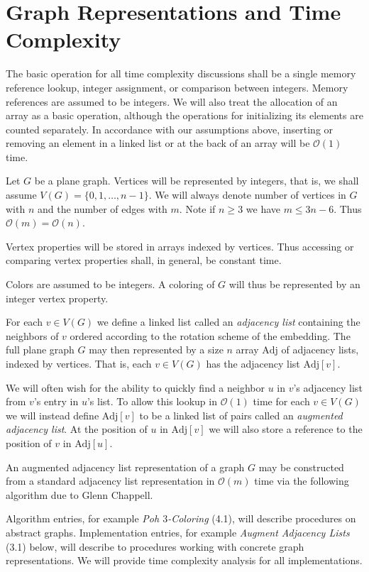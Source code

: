 \documentclass[letterpaper, 12pt]{article}
\theoremstyle{definition}
\theoremstyle{definition}
\theoremstyle{thm}
\theoremstyle{definition}
\begin{document}
\section{Graph Representations and Time Complexity}

The basic operation for all time complexity discussions shall be a single memory
reference lookup, integer assignment, or comparison between integers. Memory
references are assumed to be integers. We will also treat the allocation of an
array as a basic operation, although the operations for initializing its
elements are counted separately. In accordance with our assumptions above,
inserting or removing an element in a linked list or at the back of an array
will be $\mathcal{O}(1)$ time.

Let $G$ be a plane graph. Vertices will be represented by integers, that is, we
shall assume $V(G)=\{0,1,\ldots,n-1\}$. We will always denote
number of vertices in $G$ with $n$ and the number of edges with $m$. Note if
$n\ge 3$ we have $m\le 3n-6$. Thus $\mathcal{O}(m)= \mathcal{O}(n)$.

Vertex properties will be stored in arrays indexed by vertices. Thus accessing
or comparing vertex properties shall, in general, be constant time.

Colors are assumed to be integers. A coloring of $G$ will thus be represented by
an integer vertex property.

For each $v\in V(G)$ we define a linked list called an
\emph{adjacency list} containing the neighbors of $v$ ordered according to
the rotation scheme of the embedding. The full plane graph $G$ may then
represented by a size $n$ array $\text{Adj}$ of adjacency lists, indexed by vertices.
That is, each $v\in V(G)$ has the adjacency list $\text{Adj}[v]$.

We will often wish for the ability to quickly find a neighbor $u$
in $v$'s adjacency list from $v$'s entry in $u$'s list. To allow this lookup in
$\mathcal{O}(1)$ time for each $v\in V(G)$ we will instead define $\text{Adj}[v]$
to be a linked list of pairs called an \textit{augmented adjacency list}.
At the position of $u$ in $\text{Adj}[v]$ we will also store a reference to
the position of $v$ in $\text{Adj}[u]$.

An augmented adjacency list
representation of a graph $G$ may be constructed from a standard adjacency list
representation in $\mathcal{O}(m)$ time via the following algorithm due to 
Glenn Chappell.

Algorithm entries, for example \textit{Poh $3$-Coloring} (4.1), will describe
procedures on abstract graphs. Implementation entries, for example
\textit{Augment Adjacency Lists} (3.1) below, will describe to procedures
working with concrete graph representations. We will provide time complexity
analysis for all implementations.\\
\end{document}
